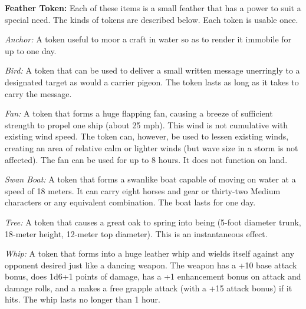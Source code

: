 



\textbf{Feather Token:} Each of these items is a small feather that has a power to suit a special need. The kinds of tokens are described below. Each token is usable once.

\begin{itemize*}
\item \textit{Anchor:} A token useful to moor a craft in water so as to render it immobile for up to one day.
\item \textit{Bird:} A token that can be used to deliver a small written message unerringly to a designated target as would a carrier pigeon. The token lasts as long as it takes to carry the message.
\item \textit{Fan:} A token that forms a huge flapping fan, causing a breeze of sufficient strength to propel one ship (about 25 mph). This wind is not cumulative with existing wind speed. The token can, however, be used to lessen existing winds, creating an area of relative calm or lighter winds (but wave size in a storm is not affected). The fan can be used for up to 8 hours. It does not function on land.
\item \textit{Swan Boat:} A token that forms a swanlike boat capable of moving on water at a speed of 18 meters. It can carry eight horses and gear or thirty-two Medium characters or any equivalent combination. The boat lasts for one day.
\item \textit{Tree:} A token that causes a great oak to spring into being (5-foot diameter trunk, 18-meter height, 12-meter top diameter). This is an instantaneous effect.
\item \textit{Whip:} A token that forms into a huge leather whip and wields itself against any opponent desired just like a dancing weapon. The weapon has a +10 base attack bonus, does 1d6+1 points of damage, has a +1 enhancement bonus on attack and damage rolls, and a makes a free grapple attack (with a +15 attack bonus) if it hits. The whip lasts no longer than 1 hour.
\end{itemize*}

